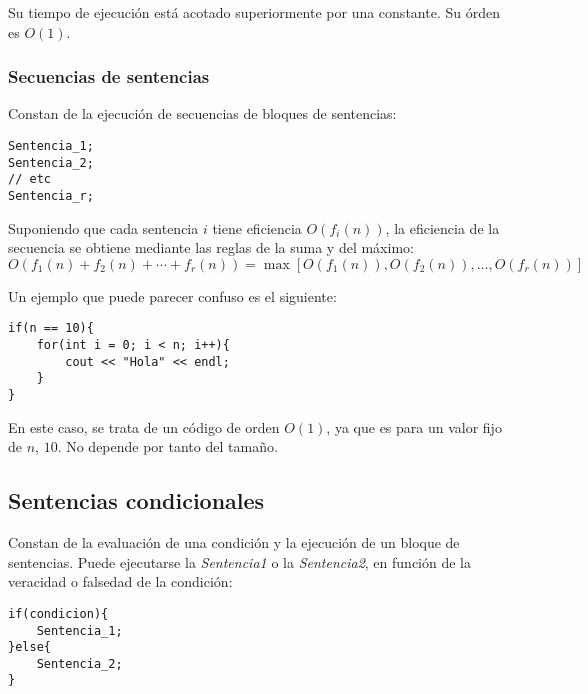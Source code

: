 Su tiempo de ejecución está acotado superiormente por una constante. Su órden es $O(1)$.

\subsubsection{Secuencias de sentencias}
Constan de la ejecución de secuencias de bloques de sentencias:
\begin{listing}[H]
    \begin{verbatim}
Sentencia_1;
Sentencia_2;
// etc
Sentencia_r;
    \end{verbatim}
\end{listing}
Suponiendo que cada sentencia $i$ tiene eficiencia $O(f_i(n))$, la eficiencia de la secuencia se obtiene mediante las reglas de la suma y del máximo:
\begin{equation*}
O(f_1(n) + f_2(n) + \cdots + f_r(n)) = \max\left[O(f_1(n)), O(f_2(n)), \ldots, O(f_r(n))\right]
\end{equation*}

\begin{ejemplo}
Un ejemplo que puede parecer confuso es el siguiente:
\begin{listing}[H]
    \begin{verbatim}
if(n == 10){
    for(int i = 0; i < n; i++){
        cout << "Hola" << endl;
    }
}
    \end{verbatim}
\end{listing}
En este caso, se trata de un código de orden $O(1)$, ya que es para un valor fijo de $n$, $10$.  No depende por tanto del tamaño.
\end{ejemplo}

\subsection{Sentencias condicionales}
Constan de la evaluación de una condición y la ejecución de un bloque de sentencias. Puede ejecutarse la \emph{Sentencia1} o la \emph{Sentencia2}, en función de la veracidad o falsedad de la condición:

\begin{listing}[H]
    \begin{verbatim}
if(condicion){
    Sentencia_1;
}else{
    Sentencia_2;
}
    \end{verbatim}
\end{listing}


